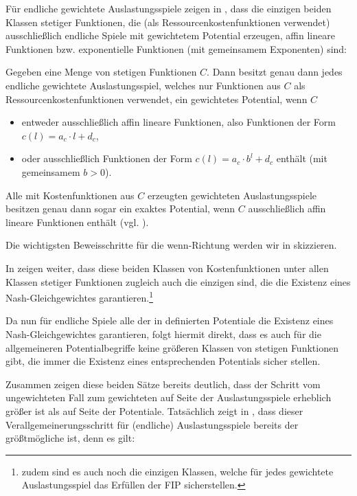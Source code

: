 Für endliche gewichtete Auslastungsspiele zeigen \citeauthor{CharExGewPotinWCG} in \cite[Theorem 3.9]{CharExGewPotinWCG}, dass die einzigen beiden Klassen stetiger Funktionen, die (als Ressourcenkostenfunktionen verwendet) ausschließlich endliche Spiele mit gewichtetem Potential erzeugen, affin lineare Funktionen bzw. exponentielle Funktionen (mit gemeinsamem Exponenten) sind:

\begin{satz}\label{satz:CharExGewPotinWCG}
	Gegeben eine Menge von stetigen Funktionen $C$. Dann besitzt genau dann jedes endliche gewichtete Auslastungsspiel, welches nur Funktionen aus $C$ als Ressourcenkostenfunktionen verwendet, ein gewichtetes Potential, wenn $C$
	\begin{itemize}
		\item entweder ausschließlich affin lineare Funktionen, also Funktionen der Form $c(l) = a_c \cdot l + d_c$,
		\item oder ausschließlich Funktionen der Form $c(l) = a_c\cdot b^l + d_c$ enthält (mit gemeinsamem $b > 0$).
	\end{itemize}
	Alle mit Kostenfunktionen aus $C$ erzeugten gewichteten Auslastungsspiele besitzen genau dann sogar ein exaktes Potential, wenn $C$ ausschließlich affin lineare Funktionen enthält (vgl. \cite[Theorem 3.7]{CharExGewPotinWCG}).
\end{satz}

Die wichtigsten Beweisschritte für die \glqq wenn\grqq-Richtung werden wir in  skizzieren.

In \cite[Theorem 5.1]{CharExNGinWCG} zeigen \citeauthor{CharExNGinWCG} weiter, dass diese beiden Klassen von Kostenfunktionen unter allen Klassen stetiger Funktionen zugleich auch die einzigen sind, die die Existenz eines Nash-Gleichgewichtes garantieren.\footnote{zudem sind es auch noch die einzigen Klassen, welche für jedes gewichtete Auslastungsspiel das Erfüllen der FIP sicherstellen.}

Da nun für endliche Spiele alle der in  definierten Potentiale die Existenz eines Nash-Gleichgewichtes garantieren, folgt hiermit direkt, dass es auch für die allgemeineren Potentialbegriffe keine größeren Klassen von stetigen Funktionen gibt, die immer die Existenz eines entsprechenden Potentials sicher stellen.

Zusammen zeigen diese beiden Sätze bereits deutlich, dass der Schritt vom ungewichteten Fall zum gewichteten auf Seite der Auslastungsspiele erheblich größer ist als auf Seite der Potentiale. Tatsächlich zeigt \citeauthor{ReprOfFiniteGamesAsNCG} in \cite[Theorem 1]{ReprOfFiniteGamesAsNCG}, dass dieser Verallgemeinerungsschritt für (endliche) Auslastungsspiele bereits der größtmögliche ist, denn es gilt:

